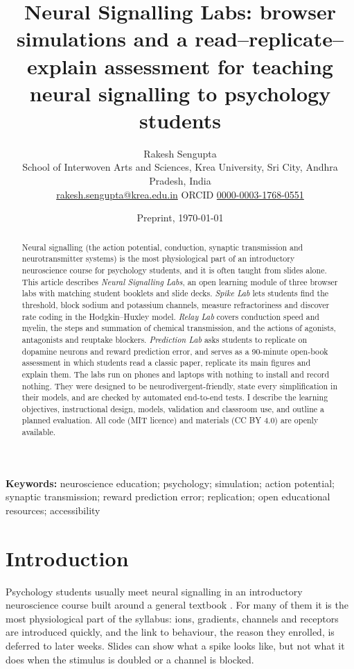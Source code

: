 \documentclass[11pt,a4paper]{article}
\title{\textbf{Neural Signalling Labs: browser simulations and a read--replicate--explain assessment for teaching neural signalling to psychology students}}
\author{Rakesh Sengupta\\[2pt]
\small School of Interwoven Arts and Sciences, Krea University, Sri City, Andhra Pradesh, India\\
\small \href{mailto:rakesh.sengupta@krea.edu.in}{rakesh.sengupta@krea.edu.in} \quad ORCID \href{https://orcid.org/0000-0003-1768-0551}{0000-0003-1768-0551}}
\date{Preprint, \today}
\begin{document}
\maketitle

\begin{abstract}
\noindent Neural signalling (the action potential, conduction, synaptic transmission and neurotransmitter systems) is the most physiological part of an introductory neuroscience course for psychology students, and it is often taught from slides alone. This article describes \emph{Neural Signalling Labs}, an open learning module of three browser labs with matching student booklets and slide decks. \emph{Spike Lab} lets students find the threshold, block sodium and potassium channels, measure refractoriness and discover rate coding in the Hodgkin--Huxley model. \emph{Relay Lab} covers conduction speed and myelin, the steps and summation of chemical transmission, and the actions of agonists, antagonists and reuptake blockers. \emph{Prediction Lab} asks students to replicate \citet{schultz1997} on dopamine neurons and reward prediction error, and serves as a 90-minute open-book assessment in which students read a classic paper, replicate its main figures and explain them. The labs run on phones and laptops with nothing to install and record nothing. They were designed to be neurodivergent-friendly, state every simplification in their models, and are checked by automated end-to-end tests. I describe the learning objectives, instructional design, models, validation and classroom use, and outline a planned evaluation. All code (MIT licence) and materials (CC BY 4.0) are openly available.
\end{abstract}

\noindent\textbf{Keywords:} neuroscience education; psychology; simulation; action potential; synaptic transmission; reward prediction error; replication; open educational resources; accessibility

\section{Introduction}

Psychology students usually meet neural signalling in an introductory neuroscience course built around a general textbook \citep{bear2016}. For many of them it is the most physiological part of the syllabus: ions, gradients, channels and receptors are introduced quickly, and the link to behaviour, the reason they enrolled, is deferred to later weeks. Slides can show what a spike looks like, but not what it does when the stimulus is doubled or a channel is blocked.
\end{document}
